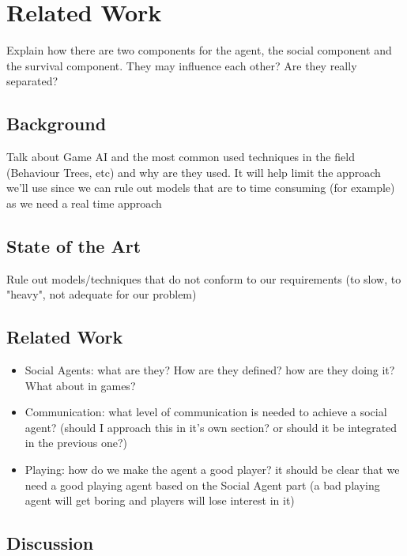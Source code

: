 \section{Related Work}
Explain how there are two components for the agent, the social component and the survival component.
They may influence each other? Are they really separated?

\subsection{Background}
Talk about Game AI and the most common used techniques in the field (Behaviour Trees, etc) and why are they used.
It will help limit the approach we'll use since we can rule out models that are to time consuming (for example) as we need a real time approach

\subsection{State of the Art}
Rule out models/techniques that do not conform to our requirements (to slow, to "heavy", not adequate for our problem)

\subsection{Related Work}
\begin{itemize}
	\item Social Agents: what are they? How are they defined? how are they doing it? What about in games?
	\item Communication: what level of communication is needed to achieve a social agent? (should I approach this in it's own section? or should it be integrated in the previous one?)
	\item Playing: how do we make the agent a good player? it should be clear that we need a good playing agent based on the Social Agent part (a bad playing agent will get boring and players will lose interest in it)
\end{itemize}

\subsection{Discussion}